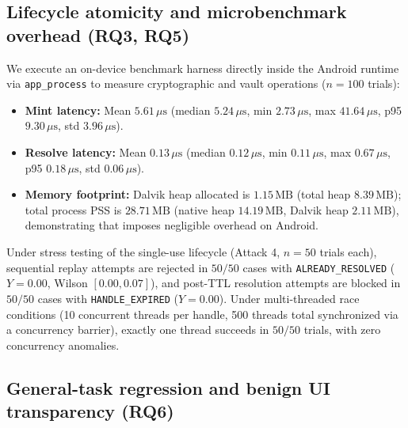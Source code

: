 \subsection{Lifecycle atomicity and microbenchmark overhead (RQ3, RQ5)}

We execute an on-device benchmark harness directly inside the Android runtime via \texttt{app\_process} to measure cryptographic and vault operations ($n=100$ trials):
\begin{itemize}[leftmargin=*]
  \item \textbf{Mint latency:} Mean $5.61\,\mu\text{s}$ (median $5.24\,\mu\text{s}$, min $2.73\,\mu\text{s}$, max $41.64\,\mu\text{s}$, p95 $9.30\,\mu\text{s}$, std $3.96\,\mu\text{s}$).
  \item \textbf{Resolve latency:} Mean $0.13\,\mu\text{s}$ (median $0.12\,\mu\text{s}$, min $0.11\,\mu\text{s}$, max $0.67\,\mu\text{s}$, p95 $0.18\,\mu\text{s}$, std $0.06\,\mu\text{s}$).
  \item \textbf{Memory footprint:} Dalvik heap allocated is $1.15\,\text{MB}$ (total heap $8.39\,\text{MB}$); total process PSS is $28.71\,\text{MB}$ (native heap $14.19\,\text{MB}$, Dalvik heap $2.11\,\text{MB}$), demonstrating that \SH{} imposes negligible overhead on Android.
\end{itemize}

Under stress testing of the single-use lifecycle (Attack 4, $n=50$ trials each), sequential replay attempts are rejected in $50/50$ cases with \texttt{ALREADY\_RESOLVED} ($Y=0.00$, Wilson $[0.00, 0.07]$), and post-TTL resolution attempts are blocked in $50/50$ cases with \texttt{HANDLE\_EXPIRED} ($Y=0.00$). Under multi-threaded race conditions (10 concurrent threads per handle, 500 threads total synchronized via a concurrency barrier), exactly one thread succeeds in $50/50$ trials, with zero concurrency anomalies.

\subsection{General-task regression and benign UI transparency (RQ6)}

